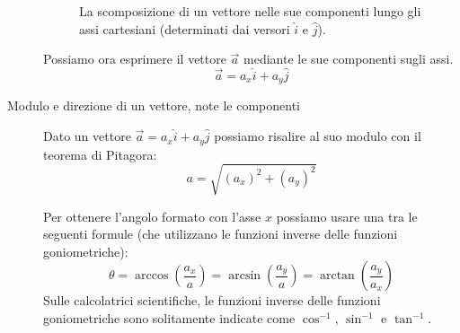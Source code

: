 \documentclass[a4paper,11pt,italian]{article}
\begin{document}
\begin{description}
    \begin{figure}[htb]\centering
    \caption{La scomposizione di un vettore nelle sue componenti lungo gli assi cartesiani (determinati dai versori $ \hat{i} $ e $ \hat{j} $).}
    \end{figure}
  
  Possiamo ora esprimere il vettore $ \vec{a} $ mediante le sue componenti sugli assi.
  \[ \vec{a} = a_x \hat{i} + a_y \hat{j} \]
  
  \item[Modulo e direzione di un vettore, note le componenti]
  Dato un vettore $ \vec{a} = a_x \hat{i} + a_y \hat{j}  $ possiamo risalire al suo modulo con il teorema di Pitagora:
  \[ a = \sqrt{(a_x)^2 + (a_y)^2} \]

\begin{soloscientifico} %
  Per ottenere l'angolo  formato con l'asse $ x $ possiamo usare una tra le seguenti formule (che utilizzano le funzioni inverse delle funzioni goniometriche):
  \[ \theta  = \arccos\left( \frac{a_x}{a} \right) = \arcsin\left( \frac{a_y}{a} \right) = \arctan\left( \frac{a_y}{a_x} \right) \]
  Sulle calcolatrici scientifiche, le funzioni inverse delle funzioni goniometriche sono solitamente indicate come $ \cos^{-1} $, $ \sin^{-1} $ e $ \tan^{-1} $.
\end{soloscientifico}   %
\end{description}
\end{document}
